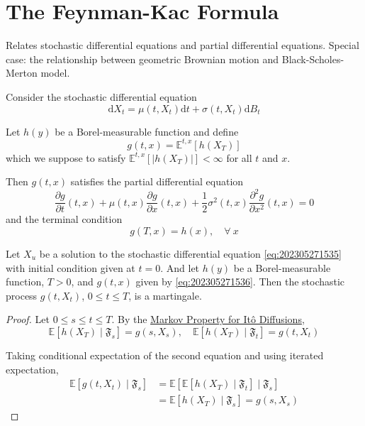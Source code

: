 \section{The Feynman-Kac Formula}

Relates stochastic differential equations and partial differential equations. Special case: the relationship between geometric Brownian motion and Black-Scholes-Merton model.

\begin{theorem}\label{thm:feynman-kac}
    Consider the stochastic differential equation 
    \begin{equation}\label{eq:202305271535}
        \mathrm{d}X_t = \mu(t, X_t) \mathrm{d}t + \sigma(t, X_t)\mathrm{d}B_t
    \end{equation}

    Let $h(y)$ be a Borel-measurable function and define 
    \begin{equation}\label{eq:202305271536}
        g(t, x) = \mathbb{E}^{t, x} [h(X_T)]
    \end{equation}
    which we suppose to satisfy $\mathbb{E}^{t, x} [|h(X_T)|] < \infty$ for all $t$ and $x$. 

    Then $g(t, x)$ satisfies the partial differential equation 
    \begin{equation*}
        \frac{\partial g}{\partial t}(t, x) + \mu(t, x) \frac{\partial g}{\partial x}(t, x) + \frac{1}{2} \sigma^2(t, x) \frac{\partial^2 g}{\partial x^2}(t, x) = 0
    \end{equation*}
    and the terminal condition 
    \begin{equation*}
        g(T, x) = h(x), \quad \forall ~x
    \end{equation*}
\end{theorem}

\begin{lemma}\label{lm:202305271614}
    Let $X_u$ be a solution to the stochastic differential equation \eqref{eq:202305271535} with initial condition given at $t = 0$. And let $h(y)$ be a Borel-measurable function, $T > 0$, and $g(t,x)$ given by \eqref{eq:202305271536}. Then the stochastic process $g(t, X_t)$, $0 \le t \le T$, is a martingale.
\end{lemma}

\begin{proof}
    Let $0 \le s \le t \le T$. By the \hyperref[thm:markov_prop_ito]{Markov Property for Itô Diffusions}, 
    \[
        \mathbb{E}[h(X_T) \mid \mathfrak{F}_s] = g(s, X_s), \quad \mathbb{E}[h(X_T) \mid \mathfrak{F}_t] = g(t, X_t)
    \]

    Taking conditional expectation of the second equation and using iterated expectation,
    \begin{equation*}
        \begin{aligned}
            \mathbb{E}[g(t, X_t) \mid \mathfrak{F}_s] & = \mathbb{E}[\mathbb{E}[h(X_T) \mid \mathfrak{F}_t] \mid \mathfrak{F}_s] \\
            &= \mathbb{E}[h(X_T) \mid \mathfrak{F}_s] = g(s, X_s)
        \end{aligned}
    \end{equation*}
\end{proof}

